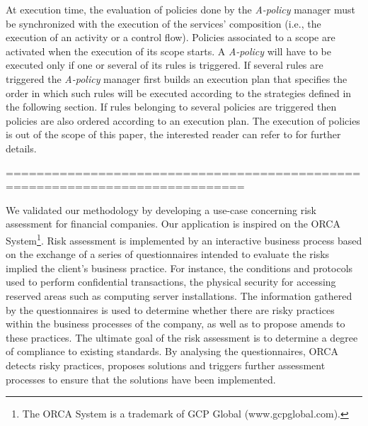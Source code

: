 At execution time, the evaluation of policies done by the {\em A-policy} manager must be synchronized with the execution of the services' composition (i.e., the execution of an activity or a control flow).  Policies associated to a scope are activated when the execution of its scope starts. A {\em A-policy} will have to be executed only if one or several of its rules is triggered. If several rules are triggered the {\em A-policy} manager first builds an execution plan that specifies the order in which such rules will be executed according to the strategies defined in the following section. 
If rules belonging to several policies are triggered then policies are also ordered according to an execution plan. The execution of policies is out of the scope of this paper, the interested reader can refer to \cite{Espinosa-Oviedo2011a} for further details.
















=============================================================================

We validated our methodology by developing a use-case concerning risk assessment for financial companies.
Our application is inspired on the ORCA System\footnote{The ORCA System is a trademark of GCP Global (www.gcpglobal.com).}.
Risk assessment is implemented by an interactive business process based on the exchange of a series of questionnaires intended to evaluate the risks implied the client's business practice.
For instance, the conditions and protocols used to perform confidential transactions, the physical security for accessing reserved areas such as computing server installations.
The information gathered by the questionnaires is used to determine whether there are risky practices within the business processes of the company, as well as to propose amends to these practices.
The ultimate goal of the risk assessment is to determine a degree of compliance to existing standards.
By analysing the questionnaires, ORCA detects risky practices, proposes solutions and triggers further assessment processes to ensure that the solutions have been implemented.

